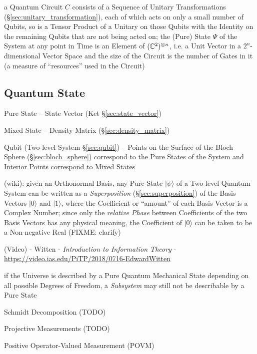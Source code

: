a Quantum Circuit $C$ consists of a Sequence of Unitary Transformations
(\S\ref{sec:unitary_transformation}), each of which acts on only a small number
of Qubits, so is a Tensor Product of a Unitary on those Qubits with the Identity
on the remaining Qubits that are not being acted on; the (Pure) State $\Psi$ of
the System at any point in Time is an Element of $(\mathbb{C}^2)^{\otimes n}$, i.e.
a Unit Vector in a $2^n$-dimensional Vector Space and the size of the Circuit is
the number of Gates in it (a measure of ``resources'' used in the Circuit)



\subsection{Quantum State}\label{sec:quantum_state}

Pure State -- State Vector (Ket \S\ref{sec:state_vector})

Mixed State -- Density Matrix (\S\ref{sec:density_matrix})

Qubit (Two-level System \S\ref{sec:qubit}) -- Points on the Surface of the Bloch
Sphere (\S\ref{sec:bloch_sphere}) correspond to the Pure States of the System
and Interior Points correspond to Mixed States

(wiki): given an Orthonormal Basis, any Pure State $|\psi\rangle$ of a Two-level
Quantum System can be written as a \emph{Superposition}
(\S\ref{sec:superposition}) of the Basis Vectors $|0\rangle$ and $|1\rangle$,
where the Coefficient or ``amount'' of each Basis Vector is a Complex Number;
since only the \emph{relative Phase} between Coefficients of the two Basis
Vectors has any physical meaning, the Coefficient of $|0\rangle$ can be taken
to be a Non-negative Real (FIXME: clarify)

\asterism

(Video) - Witten - \emph{Introduction to Information Theory} -
\url{https://video.ias.edu/PiTP/2018/0716-EdwardWitten}

if the Universe is described by a Pure Quantum Mechanical State depending on all
possible Degrees of Freedom, a \emph{Subsystem} may still not be describable by
a Pure State

Schmidt Decomposition (TODO)

Projective Measurements (TODO)

Positive Operator-Valued Measurement (POVM)


